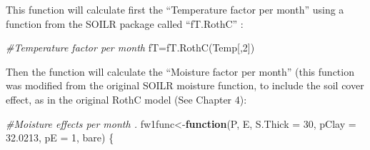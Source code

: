 \documentclass[
  10pt,
  b5paper,
]{book}
\newenvironment{Shaded}{\begin{snugshade}}{\end{snugshade}}
\newcommand{\AttributeTok}[1]{\textcolor[rgb]{0.77,0.63,0.00}{#1}}
\newcommand{\CommentTok}[1]{\textcolor[rgb]{0.56,0.35,0.01}{\textit{#1}}}
\newcommand{\ControlFlowTok}[1]{\textcolor[rgb]{0.13,0.29,0.53}{\textbf{#1}}}
\newcommand{\DecValTok}[1]{\textcolor[rgb]{0.00,0.00,0.81}{#1}}
\newcommand{\FloatTok}[1]{\textcolor[rgb]{0.00,0.00,0.81}{#1}}
\newcommand{\FunctionTok}[1]{\textcolor[rgb]{0.00,0.00,0.00}{#1}}
\newcommand{\NormalTok}[1]{#1}
\newcommand{\OtherTok}[1]{\textcolor[rgb]{0.56,0.35,0.01}{#1}}
\begin{document}
This function will calculate first the ``Temperature factor per month'' using a function from the SOILR package called ``fT.RothC'' :

\begin{Shaded}
\begin{Highlighting}[]
\CommentTok{\#Temperature factor per month}
\NormalTok{fT}\OtherTok{=}\FunctionTok{fT.RothC}\NormalTok{(Temp[,}\DecValTok{2}\NormalTok{]) }
\end{Highlighting}
\end{Shaded}

Then the function will calculate the ``Moisture factor per month'' (this function was modified from the original SOILR moisture function, to include the soil cover effect, as in the original RothC model (See Chapter 4):

\begin{Shaded}
\begin{Highlighting}[]
\CommentTok{\#Moisture effects per month . }
\NormalTok{fw1func}\OtherTok{\textless{}{-}}\ControlFlowTok{function}\NormalTok{(P, E, }\AttributeTok{S.Thick =} \DecValTok{30}\NormalTok{, }\AttributeTok{pClay =} \FloatTok{32.0213}\NormalTok{, }\AttributeTok{pE =} \DecValTok{1}\NormalTok{, bare) }
\NormalTok{\{}
   

\end{Highlighting}
\end{Shaded}
\end{document}
